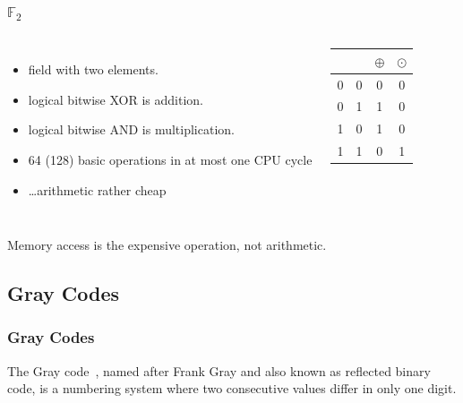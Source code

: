 \documentclass[11pt]{beamer}
\newcommand{\field}[1]{\mathbb{#1}}
\begin{document}
\begin{frame}
\frametitle{$\field{F}_2$}
\begin{columns}
 
\begin{itemize}
 \item field with two elements.
 \item logical bitwise XOR is addition.
 \item logical bitwise AND is multiplication.
 \item 64 (128) basic operations in at most one CPU cycle
 \item \dots arithmetic rather cheap
\end{itemize}
\begin{center}
\begin{tabular}{|cc|cc|}
\hline 
&  & $\oplus$ & $\odot$ \\ 
\hline
0 & 0 & 0 & 0 \\ 
0 & 1 & 1 & 0 \\ 
1 & 0 & 1 & 0 \\ 
1 & 1 & 0 & 1\\
\hline
\end{tabular}
\end{center}
\end{columns}

\begin{block}{}
Memory access is the expensive operation, not arithmetic.
\end{block}
\end{frame}

\subsection{Gray Codes}

\begin{frame}
\frametitle{Gray Codes}

The Gray code~\cite{graycode}, named after Frank Gray and also known as reflected binary code, is a numbering system where two consecutive values differ in only one digit.
 
\end{frame}
\end{document}
